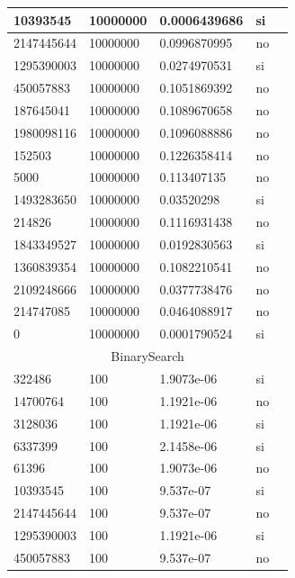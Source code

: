 \documentclass[12pt, fleqn]{article}                             %
\theoremstyle{break}                                            %
\begin{document}
\begin{longtable}{|m{5em}|m{5em}|m{10em}|m{5em}|@{}m{0pt}@{}}
            10393545& 10000000  & 0.0006439686 & si &\\[1em]    \hline
            2147445644& 10000000  & 0.0996870995 & no &\\[1em]    \hline
            1295390003& 10000000  & 0.0274970531 & si &\\[1em]    \hline
            450057883& 10000000  & 0.1051869392 & no &\\[1em]    \hline
            187645041& 10000000  & 0.1089670658 & no &\\[1em]    \hline
            1980098116& 10000000  & 0.1096088886 & no &\\[1em]    \hline
            152503& 10000000  & 0.1226358414 & no &\\[1em]    \hline
            5000& 10000000  & 0.113407135 & no &\\[1em]    \hline
            1493283650& 10000000  & 0.03520298 & si &\\[1em]    \hline
            214826& 10000000  & 0.1116931438 & no &\\[1em]    \hline
            1843349527& 10000000  & 0.0192830563 & si &\\[1em]    \hline
            1360839354& 10000000  & 0.1082210541 & no &\\[1em]    \hline
            2109248666& 10000000  & 0.0377738476 & no &\\[1em]    \hline
            214747085& 10000000  & 0.0464088917 & no &\\[1em]    \hline
            0& 10000000  & 0.0001790524 & si &\\[1em]    \hline
            \multicolumn{5}{|c|}{BinarySearch}   \\          \hline
            322486& 100  & 1.9073e-06 & si &\\[1em]    \hline
            14700764& 100  & 1.1921e-06 & no &\\[1em]    \hline
            3128036& 100  & 1.1921e-06 & si &\\[1em]    \hline
            6337399& 100  & 2.1458e-06 & si &\\[1em]    \hline
            61396& 100  & 1.9073e-06 & no &\\[1em]    \hline
            10393545& 100  & 9.537e-07 & si &\\[1em]    \hline
            2147445644& 100  & 9.537e-07 & no &\\[1em]    \hline
            1295390003& 100  & 1.1921e-06 & si &\\[1em]    \hline
            450057883& 100  & 9.537e-07 & no &\\[1em]    \hline

\end{longtable}
\end{document}

